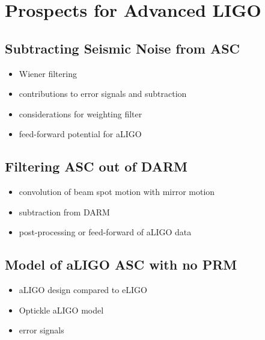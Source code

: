 \chapter{Prospects for Advanced LIGO}

\section{Subtracting Seismic Noise from ASC}
\begin{itemize}
\item Wiener filtering
\item contributions to error signals and subtraction
\item considerations for weighting filter
\item feed-forward potential for aLIGO
\end{itemize}

\section{Filtering ASC out of DARM}
\begin{itemize}
\item convolution of beam spot motion with mirror motion
\item subtraction from DARM
\item post-processing or feed-forward of aLIGO data 
\end{itemize}

\section{Model of aLIGO ASC with no PRM}
\begin{itemize}
\item aLIGO design compared to eLIGO
\item Optickle aLIGO model 
\item error signals
\end{itemize}

